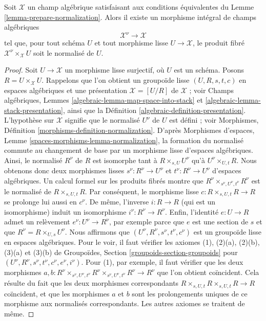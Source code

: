 \begin{lemma}
\label{lemma-normalization}
Soit $\mathcal{X}$ un champ algébrique satisfaisant aux
conditions équivalentes du Lemme \ref{lemma-prepare-normalization}.
Alors il existe un morphisme intégral de champs algébriques
$$
\mathcal{X}^\nu \longrightarrow \mathcal{X}
$$
tel que, pour tout schéma $U$ et tout morphisme lisse $U \to \mathcal{X}$,
le produit fibré $\mathcal{X}^\nu \times_\mathcal{X} U$
soit le normalisé de $U$.
\end{lemma}

\begin{proof}
Soit $U \to \mathcal{X}$ un morphisme lisse surjectif, où $U$ est un schéma.
Posons $R = U \times_\mathcal{X} U$. Rappelons que l'on obtient un groupoïde lisse
$(U, R, s, t, c)$ en espaces algébriques et une présentation
$\mathcal{X} = [U/R]$ de $\mathcal{X}$ ; voir Champs algébriques,
Lemmes \ref{algebraic-lemma-map-space-into-stack} et
\ref{algebraic-lemma-stack-presentation}, ainsi que la
Définition \ref{algebraic-definition-presentation}.
L'hypothèse sur $\mathcal{X}$ signifie que le normalisé
$U^\nu$ de $U$ est défini ; voir Morphismes, Définition
\ref{morphisms-definition-normalization}.
D'après Morphismes d'espaces, Lemme
\ref{spaces-morphisms-lemma-normalization},
la formation du normalisé commute au changement de base par un morphisme lisse
d'espaces algébriques. Ainsi, le normalisé $R^\nu$ de $R$
est isomorphe tant à $R \times_{s, U} U^\nu$ qu'à $U^\nu \times_{U, t} R$.
Nous obtenons donc deux morphismes lisses
$s^\nu : R^\nu \to U^\nu$ et $t^\nu : R^\nu \to U^\nu$
d'espaces algébriques. Un calcul formel sur les produits fibrés montre que
$R^\nu \times_{s^\nu, U^\nu, t^\nu} R^\nu$ est le normalisé
de $R \times_{s, U, t} R$. Par conséquent, le morphisme lisse
$c : R \times_{s, U, t} R \to R$ se prolonge lui aussi en $c^\nu$.
De même, l'inverse $i : R \to R$ (qui est un isomorphisme) induit
un isomorphisme $i^\nu : R^\nu \to R^\nu$. Enfin, l'identité
$e : U \to R$ admet un relèvement $e^\nu : U^\nu \to R^\nu$, par exemple
parce que $e$ est une section de $s$ et que $R^\nu = R \times_{U, s} U^\nu$.
Nous affirmons que $(U^\nu, R^\nu, s^\nu, t^\nu, c^\nu)$ est
un groupoïde lisse en espaces algébriques. Pour le voir, il faut vérifier
les axiomes (1), (2)(a), (2)(b), (3)(a) et (3)(b) de
Groupoïdes, Section \ref{groupoids-section-groupoids}
pour $(U^\nu, R^\nu, s^\nu, t^\nu, c^\nu, e^\nu, i^\nu)$.
Pour (1), par exemple, il faut vérifier que les deux morphismes
$a, b : R^\nu \times_{s^\nu, U^\nu, t^\nu} R^\nu
\times_{s^\nu, U^\nu, t^\nu} R^\nu \to R^\nu$ que l'on obtient coïncident.
Cela résulte du fait que les deux morphismes correspondants
$R \times_{s, U, t} R \times_{s, U, t} R \to R$
coïncident, et que les morphismes $a$ et $b$ sont les prolongements uniques
de ce morphisme aux normalisés correspondants. Les autres
axiomes se traitent de même.


\end{proof}
